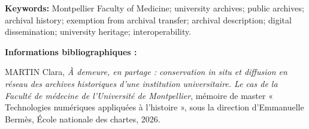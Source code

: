 \vspace{0.6cm}

\noindent\textbf{Keywords:} Montpellier Faculty of Medicine; university archives; public archives; archival history; exemption from archival transfer; archival description; digital dissemination; university heritage; interoperability.

\vfill

\noindent\textbf{Informations bibliographiques :}

\noindent MARTIN Clara, \emph{À demeure, en partage : conservation in situ et diffusion en réseau des archives historiques d'une institution universitaire. Le cas de la Faculté de médecine de l'Université de Montpellier}, mémoire de master « Technologies numériques appliquées à l'histoire », sous la direction d'Emmanuelle Bermès, École nationale des chartes, 2026.